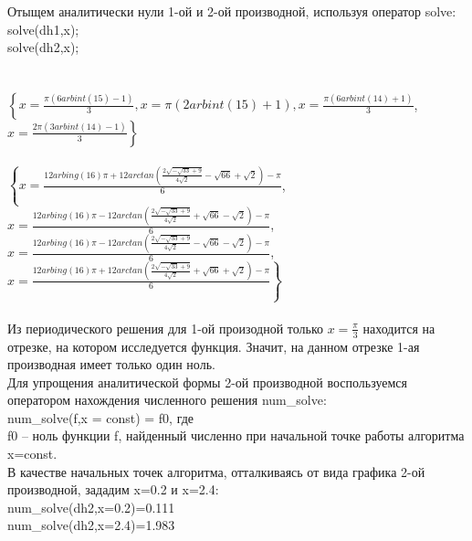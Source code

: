 \documentclass[russian,utf8,nocolumnxxxi,nocolumnxxxii]{eskdtext}
\begin{document}
\begin{figure}[H]
\begin{center}
\begin{minipage}[h]{0.75\linewidth}
\end{minipage}
\end{center}
\end{figure}
Отыщем аналитически нули 1-ой и 2-ой производной, используя оператор solve:\\
solve(dh1,x);\\
solve(dh2,x);\\
\\
\newpage
\\
$\left\{x=\frac{\pi(6arbint(15)-1)}{3}, x=\pi(2arbint(15)+1), x=\frac{\pi(6arbint(14)+1)}{3}\right.$,\\ $\left.x=\frac{2\pi(3arbint(14)-1)}{3}\right\}$
\\
\\
$\left\{x=\frac{12arbing(16)\pi+12arctan(\frac{2\sqrt{-\sqrt{33}+9}}{4\sqrt{2}}-\sqrt{66}+\sqrt{2})-\pi}{6}\right.$,\\
$x=\frac{12arbing(16)\pi-12arctan(\frac{2\sqrt{-\sqrt{33}+9}}{4\sqrt{2}}+\sqrt{66}-\sqrt{2})-\pi}{6}$,$x=\frac{12arbing(16)\pi-12arctan(\frac{2\sqrt{-\sqrt{33}+9}}{4\sqrt{2}}-\sqrt{66}-\sqrt{2})-\pi}{6}$,\\
$\left.x=\frac{12arbing(16)\pi+12arctan(\frac{2\sqrt{-\sqrt{33}+9}}{4\sqrt{2}}+\sqrt{66}+\sqrt{2})-\pi}{6}\right\}$\\
\\
Из периодического решения для 1-ой произодной только $x=\frac{\pi}{3}$ находится на отрезке, на котором исследуется функция. Значит, на данном отрезке 1-ая производная имеет только один ноль.\\
Для упрощения аналитической формы 2-ой производной воспользуемся оператором нахождения численного решения num\_solve:\\
num\_solve(f,x = const) = f0, где\\
f0 – ноль функции f, найденный численно при начальной точке работы алгоритма x=const.\\
В качестве начальных точек алгоритма, отталкиваясь от вида графика 2-ой производной, зададим x=0.2 и x=2.4:\\
num\_solve(dh2,x=0.2)=0.111\\
num\_solve(dh2,x=2.4)=1.983\\
\end{document}
